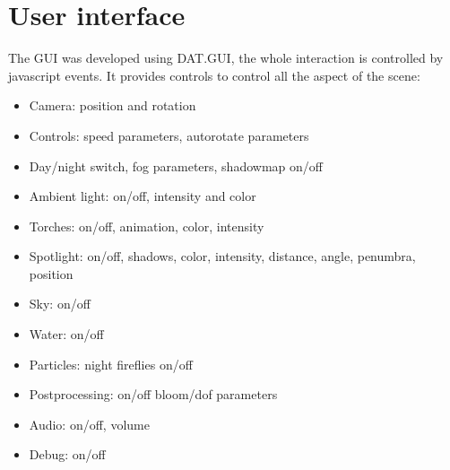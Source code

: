 \documentclass[10pt,a4paper]{article}
\begin{document}
\section{User interface}

The GUI was developed using DAT.GUI, the whole interaction is controlled by javascript events. It provides controls to control all the aspect of the scene:
 
 \begin{itemize}
 \item Camera: position and rotation
 \item Controls: speed parameters, autorotate parameters
 \item Day/night switch, fog parameters, shadowmap on/off
 \item Ambient light: on/off, intensity and color
 \item Torches: on/off, animation, color, intensity
 \item Spotlight: on/off, shadows, color, intensity, distance, angle, penumbra, position
 \item Sky: on/off
 \item Water: on/off
 \item Particles: night fireflies on/off
 \item Postprocessing: on/off bloom/dof parameters
 \item Audio: on/off, volume
 \item Debug: on/off
 \end{itemize}
 
\end{document}
